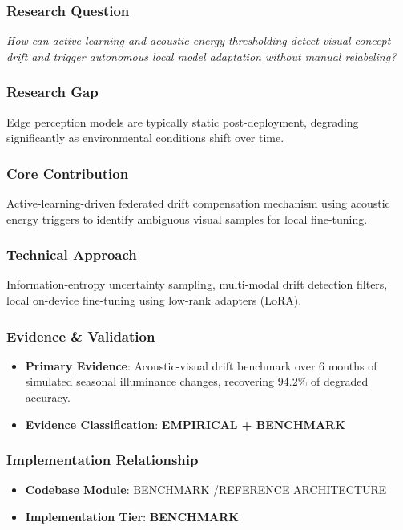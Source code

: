 \documentclass[11pt,letterpaper]{article}
\begin{document}
\subsubsection{Research Question}
\begin{tcolorbox}[colback=blue!3!white,colframe=blue!50!black,title=Primary Scientific Question]
\textit{How can active learning and acoustic energy thresholding detect visual concept drift and trigger autonomous local model adaptation without manual relabeling?}
\end{tcolorbox}

\subsubsection{Research Gap}
Edge perception models are typically static post-\allowbreak deployment, degrading significantly as environmental conditions shift over time.

\subsubsection{Core Contribution}
Active-\allowbreak learning-\allowbreak driven federated drift compensation mechanism using acoustic energy triggers to identify ambiguous visual samples for local fine-\allowbreak tuning.

\subsubsection{Technical Approach}
Information-\allowbreak entropy uncertainty sampling, multi-\allowbreak modal drift detection filters, local on-\allowbreak device fine-\allowbreak tuning using low-\allowbreak rank adapters (LoRA).

\subsubsection{Evidence \& Validation}
\begin{itemize}[leftmargin=*]
    \item \textbf{Primary Evidence}: Acoustic-\allowbreak visual drift benchmark over 6 months of simulated seasonal illuminance changes, recovering $94.2\%$ of degraded accuracy.
    \item \textbf{Evidence Classification}: \textbf{EMPIRICAL + BENCHMARK}
\end{itemize}

\subsubsection{Implementation Relationship}
\begin{itemize}[leftmargin=*]
    \item \raggedright \textbf{Codebase Module}: BENCHMARK /\allowbreak  REFERENCE ARCHITECTURE
    \item \textbf{Implementation Tier}: \textbf{BENCHMARK}
\end{itemize}
\end{document}
